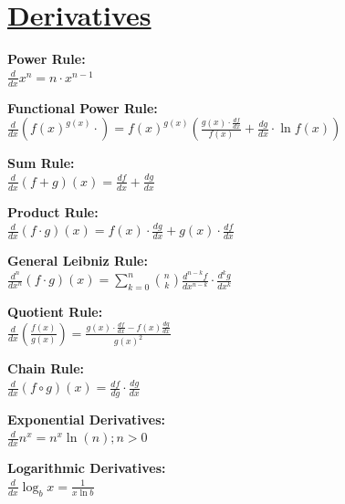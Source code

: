\documentclass[12pt]{article}
\begin{document}
\section*{\underline{\textbf{Derivatives}}}
\begin{minipage}{\textwidth}
    \textbf{Power Rule:}
    \\ \( \displaystyle\frac{ d }{ dx } x^n = n \cdot x^{n - 1} \)
\end{minipage}
\begin{minipage}{\textwidth}
    \textbf{Functional Power Rule:}
    \\ \( \displaystyle\frac{ d }{ dx } \left( f(x)^{g(x)} \cdot \right) = f(x)^{g(x)} \left( \displaystyle\frac{ g(x) \cdot \frac{ df }{ dx } }{ f(x) } + \displaystyle\frac{ dg }{ dx } \cdot \ln{f(x)} \right) \)
\end{minipage}
\begin{minipage}{\textwidth}
    \textbf{Sum Rule:}
    \\ \( \displaystyle\frac{ d }{ dx } (f + g)(x) = \displaystyle\frac{ df }{ dx } + \displaystyle\frac{ dg }{ dx } \)
\end{minipage}
\begin{minipage}{\textwidth}
    \textbf{Product Rule:}
    \\ \( \displaystyle\frac{ d }{ dx } (f \cdot g)(x) = f(x) \cdot \displaystyle\frac{ dg }{ dx } + g(x) \cdot \displaystyle\frac{ df }{ dx } \)
\end{minipage}
\begin{minipage}{\textwidth}
    \textbf{General Leibniz Rule:}
    \\ \( \displaystyle\frac{ d^n }{ dx^n } (f \cdot g)(x) = \displaystyle\sum_{k = 0}^{n} {\binom{n}{k} \displaystyle\frac{ d^{n - k} f }{ dx^{n - k} }} \cdot \displaystyle\frac{ d^k g }{ dx^k } \)
\end{minipage}
\begin{minipage}{\textwidth}
    \textbf{Quotient Rule:}
    \\ \( \displaystyle\frac{ d }{ dx } \left( \displaystyle\frac{ f(x) }{ g(x) } \right) = \displaystyle\frac{ g(x) \cdot \frac{ df }{ dx } - f(x) \frac{ dg }{ dx } }{ g(x)^2 } \)
\end{minipage}
\begin{minipage}{\textwidth}
    \textbf{Chain Rule:}
    \\ \( \displaystyle\frac{ d }{ dx } (f \circ g)(x) = \displaystyle\frac{ df }{ dg } \cdot \displaystyle\frac{ dg }{ dx } \)
\end{minipage}
\begin{minipage}{\textwidth}
    \textbf{Exponential Derivatives:}
    \\ \( \displaystyle\frac{ d }{ dx } n^x = n^x \ln(n) ; n > 0 \)
\end{minipage}
\begin{minipage}{\textwidth}
    \textbf{Logarithmic Derivatives:}
    \\ \( \displaystyle\frac{ d }{ dx } \log_b{x} = \displaystyle\frac{ 1 }{ x \ln b } \)
\end{minipage}
\end{document}
